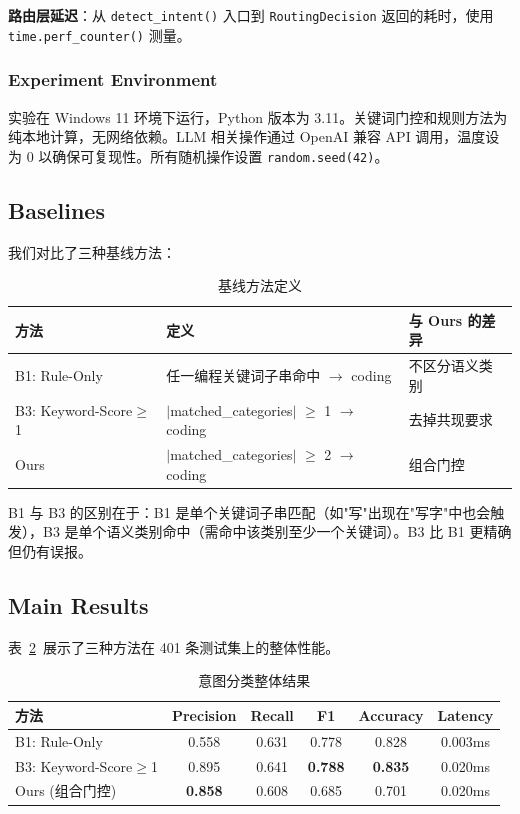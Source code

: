 \textbf{路由层延迟}：从 \texttt{detect\_intent()} 入口到 \texttt{RoutingDecision} 返回的耗时，使用 \texttt{time.perf\_counter()} 测量。

\subsubsection{Experiment Environment}

实验在 Windows 11 环境下运行，Python 版本为 3.11。关键词门控和规则方法为纯本地计算，无网络依赖。LLM 相关操作通过 OpenAI 兼容 API 调用，温度设为 0 以确保可复现性。所有随机操作设置 \texttt{random.seed(42)}。

\subsection{Baselines}

我们对比了三种基线方法：

\begin{table}[htbp]
\centering
\caption{基线方法定义}
\label{tab:baselines}
\begin{tabular}{lll}
\toprule
\textbf{方法} & \textbf{定义} & \textbf{与 Ours 的差异} \\
\midrule
B1: Rule-Only & 任一编程关键词子串命中 $\rightarrow$ coding & 不区分语义类别 \\
B3: Keyword-Score$\geq$1 & $|$matched\_categories$|$ $\geq$ 1 $\rightarrow$ coding & 去掉共现要求 \\
Ours & $|$matched\_categories$|$ $\geq$ 2 $\rightarrow$ coding & 组合门控 \\
\bottomrule
\end{tabular}
\end{table}

B1 与 B3 的区别在于：B1 是单个关键词子串匹配（如"写"出现在"写字"中也会触发），B3 是单个语义类别命中（需命中该类别至少一个关键词）。B3 比 B1 更精确但仍有误报。

\subsection{Main Results}

表~\ref{tab:results}~展示了三种方法在 401 条测试集上的整体性能。

\begin{table}[htbp]
\centering
\caption{意图分类整体结果}
\label{tab:results}
\begin{tabular}{lccccc}
\toprule
\textbf{方法} & \textbf{Precision} & \textbf{Recall} & \textbf{F1} & \textbf{Accuracy} & \textbf{Latency} \\
\midrule
B1: Rule-Only & 0.558 & 0.631 & 0.778 & 0.828 & 0.003ms \\
B3: Keyword-Score$\geq$1 & 0.895 & 0.641 & \textbf{0.788} & \textbf{0.835} & 0.020ms \\
Ours (组合门控) & \textbf{0.858} & 0.608 & 0.685 & 0.701 & 0.020ms \\
\bottomrule
\end{tabular}
\end{table}

